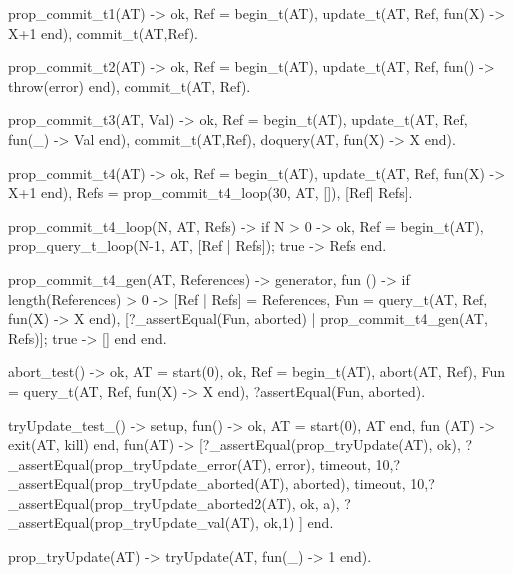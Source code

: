 \documentclass[11pt]{article}
\renewenvironment{verbatim}{}{}
\begin{document}
\begin{verbatim}
%

prop_commit_t1(AT) ->
    {ok, Ref} = begin_t(AT),
    update_t(AT, Ref, fun(X) -> X+1 end),
    commit_t(AT,Ref).

prop_commit_t2(AT) ->
    {ok, Ref} = begin_t(AT),
    update_t(AT, Ref, fun() -> throw(error) end),
    commit_t(AT, Ref).

prop_commit_t3(AT, Val) ->
    {ok, Ref} = begin_t(AT),
    update_t(AT, Ref, fun(_) -> Val end),
    commit_t(AT,Ref),
    doquery(AT, fun(X) -> X end). %Read current server state

prop_commit_t4(AT) ->
    {ok, Ref} =  begin_t(AT),
    update_t(AT, Ref, fun(X) -> X+1 end),
    Refs = prop_commit_t4_loop(30, AT, []),
    [Ref| Refs].

prop_commit_t4_loop(N, AT, Refs) -> %Creates a lot of transactions
    if N > 0 ->
           {ok, Ref} =  begin_t(AT),
           prop_query_t_loop(N-1, AT, [Ref | Refs]);
       true ->
           Refs
    end.

prop_commit_t4_gen(AT, References) -> %Server state should not be touched by query_t
   {generator,
    fun () ->
        if length(References) > 0 ->
               [Ref | Refs] = References,
               Fun = query_t(AT, Ref, fun(X) -> X end), %Dummy function
               [?_assertEqual(Fun, aborted)
                | prop_commit_t4_gen(AT, Refs)];
           true ->
                []
        end
    end}.


%%%%%%%%%%%%% at_extrapi %%%%%%%%%%

%%% Test abort %%%
abort_test() -> %Test if a given transaction is aborted
    {ok, AT} = start(0),
    {ok, Ref} =  begin_t(AT),
    abort(AT, Ref),
    Fun = query_t(AT, Ref, fun(X) -> X end), %Dummy function
    ?assertEqual(Fun, aborted).

%%% Test tryUpdate %%%
tryUpdate_test_() ->
    {setup,
    fun() -> {ok, AT} = start(0), AT end,
    %fun () -> {ok, AT} = start(0) end,
    fun (AT) -> exit(AT, kill) end,
    fun(AT) ->
    [?_assertEqual(prop_tryUpdate(AT), ok), %Test result if successfull
     ?_assertEqual(prop_tryUpdate_error(AT), error), %Test result if error function
     {timeout, 10,?_assertEqual(prop_tryUpdate_aborted(AT), aborted)}, %Test aborted
     {timeout, 10,?_assertEqual(prop_tryUpdate_aborted2(AT), {ok, a})}, %Test that the server state was actually changed
     ?_assertEqual(prop_tryUpdate_val(AT), {ok,1}) %Test if value is updated
    ]
    end}.

%
prop_tryUpdate(AT) ->
    tryUpdate(AT, fun(_) -> 1 end).


\end{verbatim}
\end{document}
